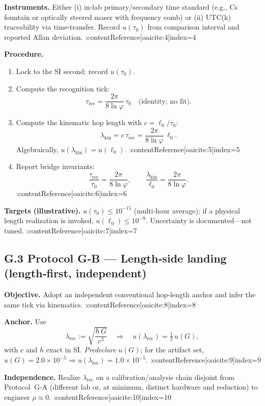 \documentclass[11pt]{article}
\begin{document}
\begin{proposition}
\textbf{Instruments.} Either (i) in‑lab primary/secondary time standard (e.g., Cs fountain or optically steered maser with frequency comb) or (ii) UTC(k) traceability via time‑transfer. Record $u(\tau_{0})$ from comparison interval and reported Allan deviation. :contentReference[oaicite:4]{index=4}

\textbf{Procedure.}
\begin{enumerate}
  \item Lock to the SI second; record $u(\tau_{0})$.
  \item Compute the recognition tick:
  \[
  \tau_{\mathrm{rec}}=\frac{2\pi}{8\ln\varphi}\,\tau_{0}\quad\text{(identity; no fit)}.
  \]
  \item Compute the kinematic hop length with $c=\ell_{0}/\tau_{0}$:
  \[
  \lambda_{\mathrm{kin}}=c\,\tau_{\mathrm{rec}}=\frac{2\pi}{8\ln\varphi}\,\ell_{0}.
  \]
  Algebraically, $u(\lambda_{\mathrm{kin}})=u(\ell_{0})$. :contentReference[oaicite:5]{index=5}
  \item Report bridge invariants:
  \[
    \frac{\tau_{\mathrm{rec}}}{\tau_{0}}=\frac{2\pi}{8\ln\varphi},\qquad
    \frac{\lambda_{\mathrm{kin}}}{\ell_{0}}=\frac{2\pi}{8\ln\varphi}.
  \] 
  :contentReference[oaicite:6]{index=6}
\end{enumerate}

\textbf{Targets (illustrative).} $u(\tau_{0})\!\le\!10^{-15}$ (multi‑hour average); if a physical length realization is invoked, $u(\ell_{0})\!\le\!10^{-9}$.
Uncertainty is documented—not tuned. :contentReference[oaicite:7]{index=7}

\medskip

\subsection*{G.3 Protocol G‑B — Length‑side landing (length‑first, independent)}
\textbf{Objective.} Adopt an independent conventional hop‑length anchor and infer the same tick via kinematics. :contentReference[oaicite:8]{index=8}

\textbf{Anchor.} Use
\[
\lambda_{\mathrm{rec}}:=\sqrt{\frac{\hbar\,G}{c^{3}}}\quad\Rightarrow\quad
u(\lambda_{\mathrm{rec}})=\tfrac12\,u(G),
\]
with $c$ and $h$ exact in SI. \emph{Predeclare} $u(G)$; for the artifact set, $u(G)=2.0\times10^{-5}\Rightarrow u(\lambda_{\mathrm{rec}})=1.0\times10^{-5}$. :contentReference[oaicite:9]{index=9}

\textbf{Independence.} Realize $\lambda_{\mathrm{rec}}$ on a calibration/analysis chain disjoint from Protocol~G‑A (different lab or, at minimum, distinct hardware and reduction) to engineer $\rho\!\approx\!0$. :contentReference[oaicite:10]{index=10}


\end{proposition}
\end{document}
